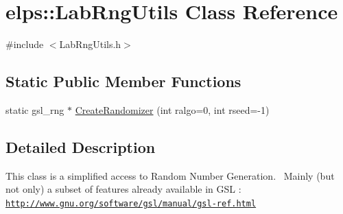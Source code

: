 \hypertarget{classelps_1_1_lab_rng_utils}{\section{elps\+:\+:Lab\+Rng\+Utils Class Reference}
\label{classelps_1_1_lab_rng_utils}
}


{\ttfamily \#include $<$Lab\+Rng\+Utils.\+h$>$}

\subsection*{Static Public Member Functions}
\begin{DoxyCompactItemize}
\item 
static gsl\+\_\+rng $\ast$ \hyperlink{classelps_1_1_lab_rng_utils_a78d684338cc111f94e9ea16901b001cd}{Create\+Randomizer} (int ralgo=0, int rseed=-\/1)
\end{DoxyCompactItemize}


\subsection{Detailed Description}
This class is a simplified access to Random Number Generation.~\newline
 Mainly (but not only) a subset of features already available in G\+S\+L \+:~\newline
 \href{http://www.gnu.org/software/gsl/manual/gsl-ref.html}{\tt http\+://www.\+gnu.\+org/software/gsl/manual/gsl-\/ref.\+html} 

